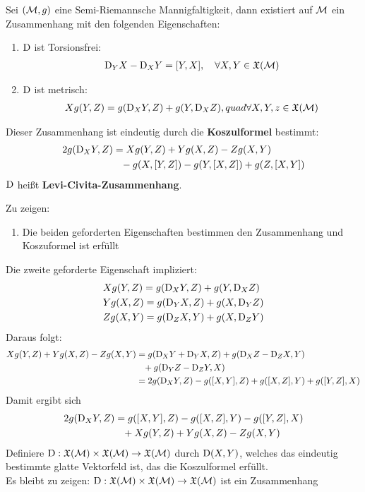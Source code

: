\begin{satz}
\label{satz:koszulformel}
Sei $(\mathcal{M}, g)$ eine Semi-Riemannsche Mannigfaltigkeit, dann existiert auf $\mathcal{M}$ ein Zusammenhang mit den folgenden Eigenschaften:
\begin{enumerate}
\item $\mathrm{D}$ ist Torsionsfrei:
\begin{align}
\covd_Y X - \covd_X Y = \comm{Y}{X}, \quad \forall X, Y \in \mathfrak{X}(\mfk)
\end{align}
\item $\mathrm{D}$ ist metrisch:
\begin{align}
X g(Y, Z) = g(\mathrm{D}_X Y, Z) + g(Y, \mathrm{D}_X Z), quad \forall X,Y,z \in \mathfrak{X}(\mathcal{M})
\end{align}
\end{enumerate}
Dieser Zusammenhang ist eindeutig durch die \textbf{Koszulformel} bestimmt:
\begin{align}
2 g (\covd_X Y, Z) &= X g(Y, Z) + Y g(X, Z) - Z g(X, Y)\\
&\phantom{=} - g(X, \comm{Y}{Z}) - g(Y, \comm{X}{Z}) + g(Z, \comm{X}{Y})
\end{align}
$\mathrm{D}$ heißt \textbf{Levi-Civita-Zusammenhang}.
\end{satz}

\begin{bew}
Zu zeigen:
\begin{enumerate}
\item Die beiden geforderten Eigenschaften bestimmen den Zusammenhang und Koszuformel ist erfüllt
\end{enumerate}
Die zweite geforderte Eigenschaft impliziert:
\begin{align*}
&X g(Y, Z) = g(\mathrm{D}_X Y, Z) + g(Y, \mathrm{D}_X Z)\\
&Y g(X , Z) = g (\mathrm{D}_Y X, Z) + g(X, \mathrm{D}_Y Z)\\
&Z g(X, Y) = g(\mathrm{D}_Z X, Y) + g(X, \mathrm{D}_Z Y)
\end{align*}
Daraus folgt:
\begin{align*}
X g(Y, Z) + Y g(X , Z) - Z g(X, Y) &= g(\covd_X Y + \covd_Y X, Z) + g(\covd_X Z - \covd_Z X , Y)\\
 & \phantom{=}+ g(\covd_Y Z - \covd_Z Y, X) \\
 &= 2 g(\covd_X Y, Z) - g(\comm{X}{Y}, Z) + g(\comm{X}{Z}, Y) + g(\comm{Y}{Z}, X)
\end{align*}
Damit ergibt sich
\begin{align}
2 g(\covd_X Y, Z) &= g(\comm{X}{Y}, Z) - g(\comm{X}{Z}, Y) - g(\comm{Y}{Z}, X)\\
&\phantom{=} + X g(Y, Z) + Y g(X, Z) - Z g(X, Y)
\end{align}
Definiere $\mathrm{D} : \mathfrak{X}(\mathcal{M}) \times \mathfrak{X}(\mathcal{M}) \to \mathfrak{X}(\mathcal{M})$
durch $\mathrm{D} (X, Y)$, welches das eindeutig bestimmte glatte Vektorfeld ist, das die Koszulformel erfüllt.\\
Es bleibt zu zeigen:
$\mathrm{D} : \mathfrak{X}(\mathcal{M}) \times \mathfrak{X}(\mathcal{M}) \to \mathfrak{X}(\mathcal{M}) $ ist ein Zusammenhang
\end{bew}

